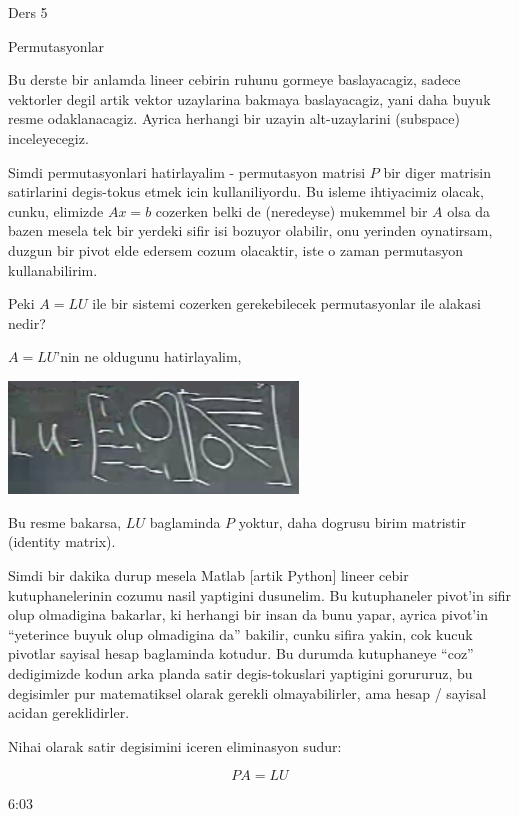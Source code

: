 \documentclass[12pt,fleqn]{article}\usepackage{../common}
\begin{document}
Ders 5

Permutasyonlar

Bu derste bir anlamda lineer cebirin ruhunu gormeye baslayacagiz, sadece
vektorler degil artik vektor uzaylarina bakmaya baslayacagiz, yani daha
buyuk resme odaklanacagiz. Ayrica herhangi bir uzayin alt-uzaylarini
(subspace) inceleyecegiz. 

Simdi permutasyonlari hatirlayalim - permutasyon matrisi $P$ bir diger
matrisin satirlarini degis-tokus etmek icin kullaniliyordu. Bu isleme
ihtiyacimiz olacak, cunku, elimizde $Ax=b$ cozerken belki de (neredeyse)
mukemmel bir $A$ olsa da bazen mesela tek bir yerdeki sifir isi bozuyor
olabilir, onu yerinden oynatirsam, duzgun bir pivot elde edersem cozum
olacaktir, iste o zaman permutasyon kullanabilirim.

Peki $A=LU$ ile bir sistemi cozerken gerekebilecek permutasyonlar ile
alakasi nedir?

$A=LU$'nin ne oldugunu hatirlayalim, 

\includegraphics[height=3cm]{5_01.png}

Bu resme bakarsa, $LU$ baglaminda $P$ yoktur, daha dogrusu birim matristir
(identity matrix). 

Simdi bir dakika durup mesela Matlab [artik Python] lineer cebir
kutuphanelerinin cozumu nasil yaptigini dusunelim. Bu kutuphaneler pivot'in
sifir olup olmadigina bakarlar, ki herhangi bir insan da bunu yapar, ayrica
pivot'in ``yeterince buyuk olup olmadigina da'' bakilir, cunku sifira
yakin, cok kucuk pivotlar sayisal hesap baglaminda kotudur. Bu durumda
kutuphaneye ``coz'' dedigimizde kodun arka planda satir degis-tokuslari
yaptigini gorururuz, bu degisimler pur matematiksel olarak gerekli
olmayabilirler, ama hesap / sayisal acidan gereklidirler. 

Nihai olarak satir degisimini iceren eliminasyon sudur:

$$ PA = LU $$

6:03
\end{document}

